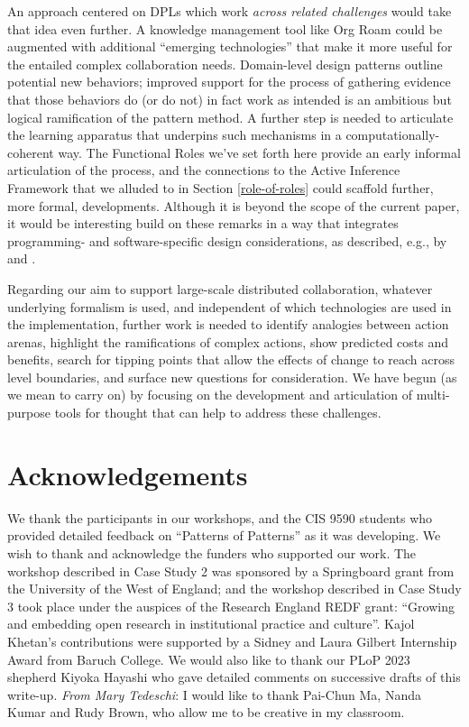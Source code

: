 \documentclass[acmlarge,timestamp]{acmart}
\begin{document}
An approach centered on DPLs which work \emph{across related
challenges} would take that idea even further.  A knowledge management
tool like Org Roam could be augmented with additional “emerging
technologies” that make it more useful for the entailed complex
collaboration needs.  Domain-level design patterns outline potential
new behaviors; improved support for the process of gathering evidence
that those behaviors do (or do not) in fact work as intended is an
ambitious but logical ramification of the pattern method.  A further
step is needed to articulate the learning apparatus that underpins
such mechanisms in a computationally-coherent way.  The {\sc
  Functional Roles} we’ve set forth here provide an early informal
articulation of the process, and the connections to the Active
Inference Framework that we alluded to in Section \ref{role-of-roles}
could scaffold further, more formal, developments.
Although it is beyond the scope of the current paper, it would be
interesting build on these remarks in a way that integrates
programming- and software-specific design considerations, as
described, e.g., by \citet{felleisen2018design} and
\citet{lowy2019righting}.

Regarding our aim to support large-scale distributed collaboration,
whatever underlying formalism is used, and independent of which
technologies are used in the implementation, further work is needed to
identify analogies between action arenas, highlight the ramifications
of complex actions, show predicted costs and benefits, search for
tipping points that allow the effects of change to reach across level
boundaries, and surface new questions for consideration.  We have
begun (as we mean to carry on) by focusing on the development and
articulation of multi-purpose tools for thought that can help to
address these challenges.

\section*{Acknowledgements}
We thank the participants in our workshops, and the CIS 9590 students
who provided detailed feedback on “Patterns of Patterns” as it was
developing.  We wish to thank and acknowledge the funders who
supported our work.  The workshop described in Case Study 2 was
sponsored by a Springboard grant from the University of the West of
England; and the workshop described in Case Study 3 took place under
the auspices of the Research England REDF grant: “Growing and
embedding open research in institutional practice and culture”.  Kajol
Khetan’s contributions were supported by a Sidney and Laura Gilbert
Internship Award from Baruch College.  We would also like to thank our
PLoP 2023 shepherd Kiyoka Hayashi who gave detailed comments on
successive drafts of this write-up.  \textit{From Mary Tedeschi}: I
would like to thank Pai-Chun Ma, Nanda Kumar and Rudy Brown, who allow
me to be creative in my classroom.
\end{document}
